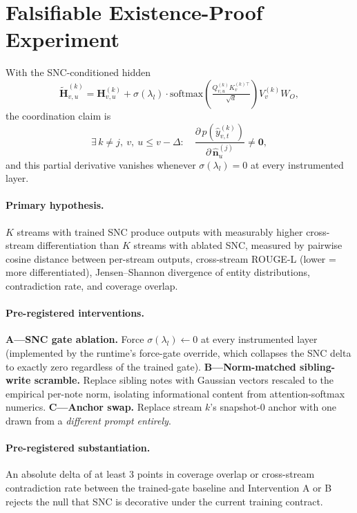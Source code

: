 \section{Falsifiable Existence-Proof Experiment}
\label{sec:falsifiability}

With the SNC-conditioned hidden
\[
\widetilde{\mathbf{H}}^{(k)}_{v,u} = \mathbf{H}^{(k)}_{v,u} + \sigma(\lambda_l) \cdot \mathrm{softmax}\!\left(\tfrac{Q^{(k)}_{v,u} K^{(k)\top}_v}{\sqrt{d}}\right) V^{(k)}_v W_O,
\]
the coordination claim is
\[
\exists\, k \ne j,\ v,\ u \le v-\Delta:\quad \frac{\partial\, p(\hat y^{(k)}_{v,t})}{\partial\, \widehat{\mathbf{n}}^{(j)}_{u}} \ne \mathbf{0},
\]
and this partial derivative vanishes whenever $\sigma(\lambda_l) = 0$ at every instrumented layer.

\paragraph{Primary hypothesis.} $K$ streams with trained SNC produce outputs with measurably higher cross-stream differentiation than $K$ streams with ablated SNC, measured by pairwise cosine distance between per-stream outputs, cross-stream ROUGE-L (lower = more differentiated), Jensen--Shannon divergence of entity distributions, contradiction rate, and coverage overlap.

\paragraph{Pre-registered interventions.} \textbf{A---SNC gate ablation.} Force $\sigma(\lambda_l) \leftarrow 0$ at every instrumented layer (implemented by the runtime's force-gate override, which collapses the SNC delta to exactly zero regardless of the trained gate). \textbf{B---Norm-matched sibling-write scramble.} Replace sibling notes with Gaussian vectors rescaled to the empirical per-note norm, isolating informational content from attention-softmax numerics. \textbf{C---Anchor swap.} Replace stream $k$'s snapshot-0 anchor with one drawn from a \emph{different prompt entirely}.

\paragraph{Pre-registered substantiation.} An absolute delta of at least 3 points in coverage overlap or cross-stream contradiction rate between the trained-gate baseline and Intervention A or B rejects the null that SNC is decorative under the current training contract.

